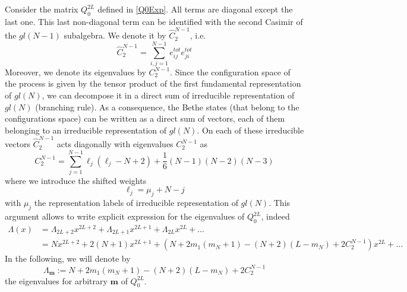 \documentclass[10pt]{article}
\numberwithin{equation}{section}
\numberwithin{equation}{subsection}
\begin{document}
Consider the matrix $Q_{0}^{2L}$ defined in \eqref{Q0Exp}. All terms are diagonal except the last one. This last non-diagonal term can be identified with the second Casimir of the $gl(N-1)$ subalgebra. We denote it by $\hat{C}_{2}^{N-1}$, i.e.
\begin{equation}
\hat C_2^{N-1}= \sum_{i,j=1}^{N-1}e_{ij}^{tot}e_{ji}^{tot}
\end{equation} 
Moreover, we denote its eigenvalues by $C_{2}^{N-1}$. Since the configuration space of the process is given by the tensor product of the first fundamental representation of $gl(N)$, we can decompose it in a direct sum of irreducible representation of $gl(N)$ (branching rule). As a consequence, the Bethe states (that belong to the configurations space) can be written as a direct sum of vectors, each of them belonging to an irreducible representation of $gl(N)$. On each of these irreducible vectors $\hat{C}_{2}^{N-1}$ acts diagonally with eigenvalues $C_{2}^{N-1}$ as 
\begin{equation}
C_2^{N-1}=\sum_{j=1}^{N-1}\ell_j(\ell_j -N+2)+\frac{1}{6}(N-1)(N-2)(N-3)
\end{equation} 
 where we introduce the shifted weights
 \begin{equation}
 	\ell_{j}=\mu_{j}+N-j
 \end{equation}
with $\mu_{j}$ the representation labels of irreducible representation of $gl(N)$. This argument allows to write explicit expression for the eigenvalues of $Q_{0}^{2L}$, indeed 
\begin{equation}
\begin{split}
\Lambda(x)&= \Lambda_{2L+2} x^{2L+2}+ \Lambda_{2L+1} x^{2L+1}+ \Lambda_{2L}x^{2L}+\ldots
\\&=N x^{2L+2}+2(N+1) x^{2L+1}+ \left(N+2m_1(m_N+1)-(N+2)(L-m_N)+2C_{2}^{N-1}\right)x^{2L}+\ldots
\end{split}
\end{equation} 
In the following, we will denote by 
\begin{equation}
	\Lambda_{\bm{m}}:=N+2m_1(m_N+1)-(N+2)(L-m_{N})+2C_{2}^{N-1}
\end{equation}
the eigenvalues for arbitrary $\bm{m}$ of $Q_{0}^{2L}$. 

\end{document}
